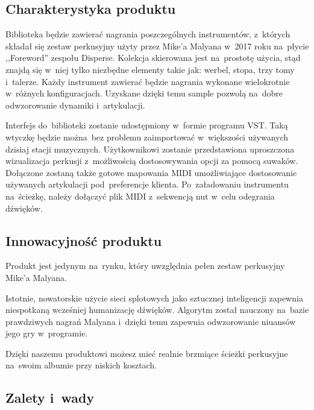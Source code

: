\documentclass[12pt]{article}
\begin{document}
\subsection{Charakterystyka produktu}


Biblioteka będzie zawierać nagrania poszczególnych instrumentów, z~których składał się zestaw perkusyjny użyty przez Mike'a Malyana w~2017 roku na~płycie ,,Foreword'' zespołu Disperse.
Kolekcja skierowana jest na~prostotę użycia, stąd znajdą się w~niej tylko niezbędne elementy takie jak: werbel, stopa, trzy tomy i~talerze.
Każdy instrument zawierać będzie nagrania wykonane wielokrotnie w~różnych konfiguracjach.
Uzyskane dzięki temu sample pozwolą na~dobre odwzorowanie dynamiki i~artykulacji.

Interfejs do~biblioteki zostanie udostępniony w~formie programu VST.
Taką wtyczkę będzie można~bez problemu zaimportować w~większości używanych dzisiaj stacji muzycznych.
Użytkownikowi zostanie przedstawiona uproszczona wizualizacja perkusji z~możliwością dostosowywania opcji za pomocą suwaków.
Dołączone zostaną także gotowe mapowania MIDI umożliwiające dostosowanie używanych artykulacji pod~preferencje klienta.
Po~załadowaniu instrumentu na~ścieżkę, należy dołączyć plik MIDI z~sekwencją nut w~celu odegrania dźwięków.

\subsection{Innowacyjność produktu}


Produkt jest jedynym na~rynku, który uwzględnia pełen zestaw perkusyjny Mike'a Malyana.

Istotnie, nowatorskie użycie sieci splotowych jako sztucznej inteligencji zapewnia niespotkaną wcześniej humanizację dźwięków.
Algorytm został nauczony na~bazie prawdziwych nagrań Malyana i~dzięki temu zapewnia odwzorowanie niuansów jego gry w~programie.

Dzięki naszemu produktowi możesz mieć realnie brzmiące ścieżki perkusyjne na~swoim albumie przy niskich kosztach.

\subsection{Zalety i~wady}
\end{document}
